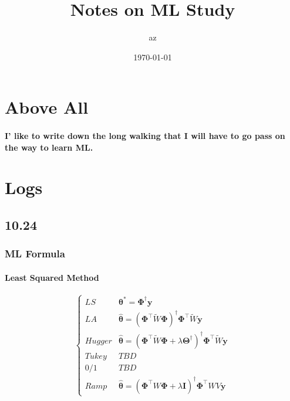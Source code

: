 \documentclass[10pt,a4paper]{article}
\author{az}
\title{Notes on ML Study}
\date{\today}
\begin{document}
\maketitle

\tableofcontents

\newpage



\section{Above All}

\paragraph{
I' like to write down the long walking that I will have to go pass on the way to learn ML.
}


\section{Logs}


\subsection{10.24}
\subsubsection{ML Formula}
\paragraph{Least Squared Method}

$$
\begin{cases}
LS
& \boldsymbol{\theta}^* =\boldsymbol{\Phi}^\dagger\boldsymbol{y}
\\
LA
&\widehat{\boldsymbol{\theta}} = (\boldsymbol\Phi^\top \widetilde{W}\boldsymbol{\Phi})^\dagger\boldsymbol\Phi^\top \widetilde{W}\boldsymbol{y}
\\
Hugger
& \widehat{\boldsymbol{\theta}} = (\boldsymbol\Phi^\top \widetilde{W}\boldsymbol{\Phi}+ \lambda\boldsymbol\Theta^\dagger)^\dagger\boldsymbol\Phi^\top \widetilde{W}\boldsymbol{y}
\\
Tukey
& TBD
\\
0/1
& TBD
\\
Ramp
& \widehat{\boldsymbol{\theta}} = (\boldsymbol\Phi^\top {W}\boldsymbol{\Phi}+ \lambda\boldsymbol I)^\dagger\boldsymbol\Phi^\top {WV}\boldsymbol{y}
\end{cases}
$$
\end{document}
